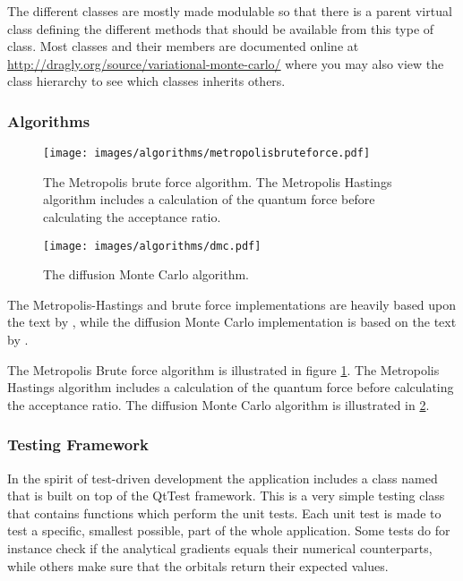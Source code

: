 \documentclass[aps,prb,twocolumn,floatfix]{revtex4}
\newcommand{\class}[1]{{\sffamily{#1}}}
\begin{document}
The different classes are mostly made modulable so that there is a parent virtual class defining the different methods that should be available from this type of class. Most classes and their members are documented online at \url{http://dragly.org/source/variational-monte-carlo/} where you may also view the class hierarchy to see which classes inherits others.

\subsubsection{Algorithms}

\begin{figure}
    \centering
    \texttt{[image: images/algorithms/metropolisbruteforce.pdf]}
    \caption{The Metropolis brute force algorithm. The Metropolis Hastings algorithm includes a calculation of the quantum force before calculating the acceptance ratio.}
    \label{fig:metropolisbruteforce}
\end{figure}
\begin{figure}
    \centering
    \texttt{[image: images/algorithms/dmc.pdf]}
    \caption{The diffusion Monte Carlo algorithm.}
    \label{fig:dmcalgorithm}
\end{figure}

The Metropolis-Hastings and brute force implementations are heavily based upon the text by \textcite{lecturenotes}, while the diffusion Monte Carlo implementation is based on the text by \textcite{kent1999techniques}.

The Metropolis Brute force algorithm is illustrated in figure \ref{fig:metropolisbruteforce}. The Metropolis Hastings algorithm includes a calculation of the quantum force before calculating the acceptance ratio. The diffusion Monte Carlo algorithm is illustrated in \ref{fig:dmcalgorithm}.

\subsubsection{Testing Framework} \label{sec:testingframework}

In the spirit of test-driven development the application includes a class named \class{VmcTest} that is built on top of the QtTest framework. This is a very simple testing class that contains functions which perform the unit tests. Each unit test is made to test a specific, smallest possible, part of the whole application. Some tests do for instance check if the analytical gradients equals their numerical counterparts, while others make sure that the orbitals return their expected values.
\end{document}
